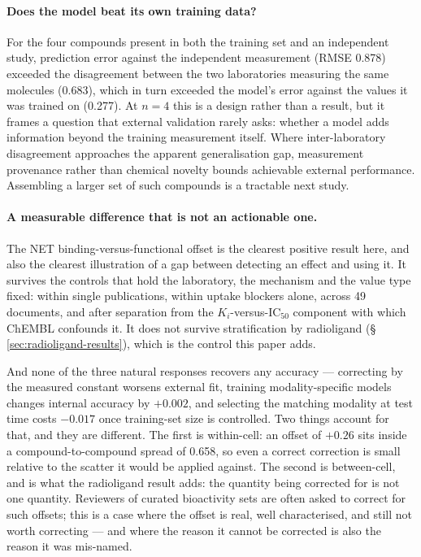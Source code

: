 \documentclass[11pt,a4paper]{article}
\begin{document}
\paragraph{Does the model beat its own training data?} For the four compounds
present in both the training set and an independent study, prediction error against
the independent measurement (RMSE 0.878) exceeded the disagreement between the two
laboratories measuring the same molecules (0.683), which in turn exceeded the
model's error against the values it was trained on (0.277). At $n=4$ this is a
design rather than a result, but it frames a question that external validation
rarely asks: whether a model adds information beyond the training measurement
itself. Where inter-laboratory disagreement approaches the apparent generalisation
gap, measurement provenance rather than chemical novelty bounds achievable external
performance. Assembling a larger set of such compounds is a tractable next study.

\paragraph{A measurable difference that is not an actionable one.} The NET
binding-versus-functional offset is the clearest positive result here, and also the
clearest illustration of a gap between detecting an effect and using it. It survives the
controls that hold the laboratory, the mechanism and the value type fixed: within single
publications, within uptake blockers alone, across 49 documents, and after separation from
the $K_i$-versus-IC$_{50}$ component with which ChEMBL confounds it. It does not survive
stratification by radioligand (\S\,\ref{sec:radioligand-results}), which is the control
this paper adds.

And none of the three natural responses recovers any accuracy --- correcting by the
measured constant worsens external fit, training modality-specific models changes internal
accuracy by $+0.002$, and selecting the matching modality at test time costs $-0.017$ once
training-set size is controlled. Two things account for that, and they are different. The
first is within-cell: an offset of $+0.26$ sits inside a compound-to-compound spread of
0.658, so even a correct correction is small relative to the scatter it would be applied
against. The second is between-cell, and is what the radioligand result adds: the quantity
being corrected for is not one quantity. Reviewers of curated bioactivity sets are often
asked to correct for such offsets; this is a case where the offset is real, well
characterised, and still not worth correcting --- and where the reason it cannot be
corrected is also the reason it was mis-named.
\end{document}
